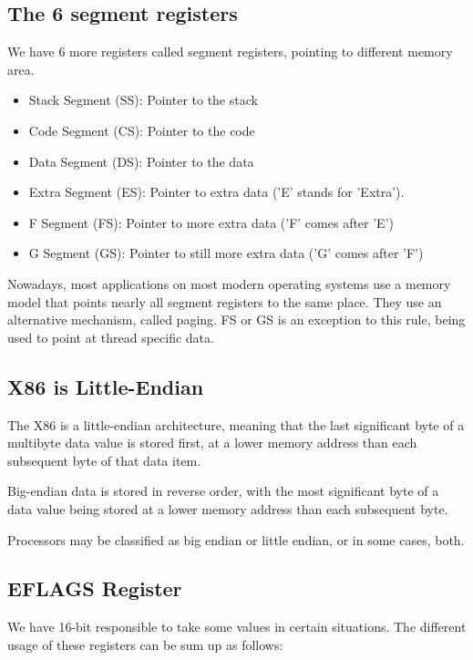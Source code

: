 \subsection{The 6 segment registers}

We have 6 more registers called segment registers, pointing to different memory area. 
\par 
\begin{itemize}
    \item Stack Segment (SS): Pointer to the
stack
    \item Code Segment (CS): Pointer to the
code
    \item Data Segment (DS): Pointer to the
data
    \item Extra Segment (ES): Pointer to extra data ('E' stands for 'Extra').
    \item F Segment (FS): Pointer to more extra data ('F' comes after 'E')
    \item G Segment (GS): Pointer to still more extra data ('G' comes after 'F')
\end{itemize}

Nowadays, most applications on most modern operating systems use a memory model that points nearly all segment registers to the same place. 
They use an alternative mechanism, called paging. FS or GS is an exception to this rule, being used to point at thread
specific data.

\subsection{X86 is Little-Endian}
The X86 is a little-endian architecture, meaning that the last significant byte of a multibyte data value is stored first, at a lower memory address than each subsequent byte of that data item. 
\par
Big-endian data is stored in reverse order, with the most significant byte
of a data value being stored at a lower memory address than each
subsequent byte.
\par 
Processors may be classified as big
endian or little endian, or in some
cases, both.

\subsection{EFLAGS Register}
We have 16-bit responsible to take some values in certain situations. The different usage of these registers can be sum up as follows: 


